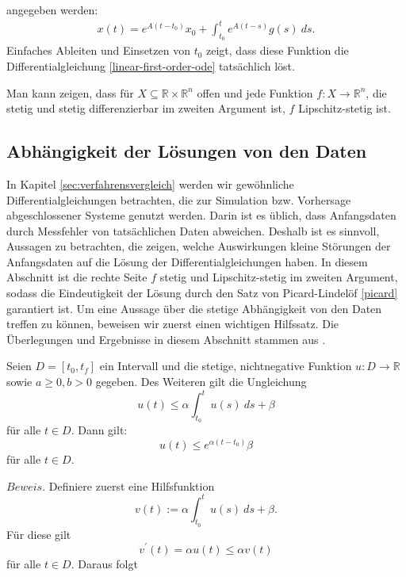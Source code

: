 \cite{Matrixexponential} angegeben werden:
\begin{align}
    \label{linear-ode-solution}
    x(t) = e^{A(t-t_0)}x_0 + \int_{t_0}^{t}e^{A(t-s)}g(s)\ ds.
\end{align}
Einfaches Ableiten und Einsetzen von $t_0$ zeigt, dass diese Funktion die Differentialgleichung
\eqref{linear-first-order-ode} tatsächlich löst.
\begin{bem}
    \label{f-lipschitz}
    Man kann zeigen, dass für $X\subseteq \mathbb{R}\times\mathbb{R}^n$ offen und jede Funktion
    $f:X \rightarrow \mathbb{R}^n$, die stetig und stetig differenzierbar im zweiten Argument ist, $f$
    Lipschitz-stetig ist.
\end{bem}
\newpage

\subsection{Abhängigkeit der Lösungen von den Daten}
In Kapitel \ref{sec:verfahrensvergleich} werden wir gewöhnliche Differentialgleichungen betrachten, die zur
Simulation bzw. Vorhersage abgeschlossener Systeme genutzt werden. Darin ist es üblich, dass Anfangsdaten durch
Messfehler von tatsächlichen Daten abweichen. Deshalb ist es sinnvoll, Aussagen zu betrachten, die zeigen, welche
Auswirkungen kleine Störungen der Anfangsdaten auf die Lösung der Differentialgleichungen haben. In diesem Abschnitt ist
die rechte Seite $f$ stetig und Lipschitz-stetig im zweiten Argument, sodass die Eindeutigkeit der Lösung durch den Satz
von Picard-Lindelöf \ref{picard} garantiert ist. Um eine Aussage über die stetige Abhängigkeit von den Daten treffen zu
können, beweisen wir zuerst einen wichtigen Hilfssatz. Die Überlegungen und Ergebnisse in diesem Abschnitt stammen aus
\cite{beckGewohnlicheDifferentialgleichungen2018}.
\begin{theorem}
    \label{Satz-gronwall}
    Seien $D=[t_{0}, t_{f}]$ ein Intervall und die stetige, nichtnegative Funktion $u : D \rightarrow \mathbb{R}$
    sowie $a \geq 0, b > 0$ gegeben. Des Weiteren gilt die Ungleichung
    \[
        u(t) \leq \alpha \int_{t_{0}}^{t}u(s)\ ds + \beta
    \]
    für alle $t \in D$. Dann gilt:
    \[
        u(t) \leq e^{\alpha(t-t_{0})}\beta
    \]
    für alle $t \in D$.
\end{theorem}
$Beweis.$ Definiere zuerst eine Hilfsfunktion
\[
    v(t) := \alpha \int_{t_{0}}^{t} u(s)\ ds + \beta.
\] Für diese gilt
\[
    v^\prime(t) = \alpha u(t) \leq \alpha v(t)
\] für alle $t \in D$. Daraus folgt
